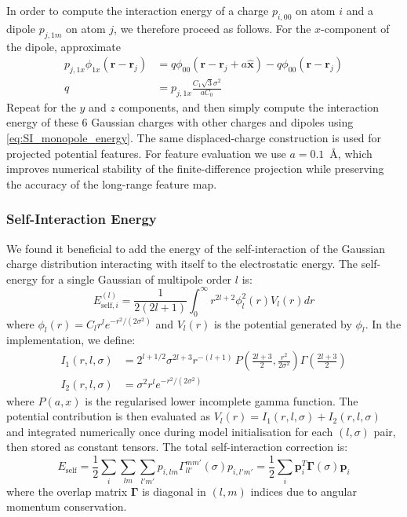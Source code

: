 \documentclass[aps,%
superscriptaddress,
 amsmath,amssymb,
floatfix,
twocolumn
]{revtex4-2}
\begin{document}
In order to compute the interaction energy of a charge $p_{i,00}$ on atom $i$ and a dipole $p_{j,1m}$ on atom $j$, we therefore proceed as follows. For the $x$-component of the dipole, approximate
\begin{align}
    p_{j,1x} \phi_{1x}(\mathbf{r}-\mathbf{r}_j) &= q \phi_{0 0}(\mathbf{r}-\mathbf{r}_j+a\hat{\mathbf{x}}) - q \phi_{0 0}(\mathbf{r}-\mathbf{r}_j) \\
    q &= p_{j,1x} \frac{C_1\sqrt{3}\sigma^2}{a C_0}
\end{align}
Repeat for the $y$ and $z$ components, and then simply compute the interaction energy of these $6$ Gaussian charges with other charges and dipoles using \eqref{eq:SI_monopole_energy}.
The same displaced-charge construction is used for projected potential features. For feature evaluation we use $a=0.1$~\AA{}, which improves numerical stability of the finite-difference projection while preserving the accuracy of the long-range feature map.

\subsubsection{Self-Interaction Energy}

We found it beneficial to add the energy of the self-interaction of the Gaussian charge distribution interacting with itself to the electrostatic energy. The self-energy for a single Gaussian of multipole order $l$ is:
\begin{equation}
E_{\text{self},i}^{(l)} = \frac{1}{2(2l+1)} \int_0^\infty r^{2l+2} \phi_l^2(r) V_l(r) dr
\end{equation}
where $\phi_l(r) = C_l r^l e^{-r^2/(2\sigma^2)}$ and $V_l(r)$ is the potential generated by $\phi_l$. In the implementation, we define:
\begin{align}
I_1(r,l,\sigma) &= 2^{l+1/2}\sigma^{2l+3}r^{-(l+1)}\,P\!\left(\frac{2l+3}{2}, \frac{r^2}{2\sigma^2}\right)\Gamma\!\left(\frac{2l+3}{2}\right) \\
I_2(r,l,\sigma) &= \sigma^2 r^l e^{-r^2/(2\sigma^2)}
\end{align}
where $P(a,x)$ is the regularised lower incomplete gamma function. The potential contribution is then evaluated as $V_l(r)=I_1(r,l,\sigma)+I_2(r,l,\sigma)$ and integrated numerically once during model initialisation for each $(l, \sigma)$ pair, then stored as constant tensors. The total self-interaction correction is:
\begin{equation}
E_{\text{self}} = \frac{1}{2} \sum_i \sum_{lm} \sum_{l'm'} p_{i,lm} \Gamma_{ll'}^{mm'}(\sigma) p_{i,l'm'} = \frac{1}{2} \sum_i \mathbf{p}_i^T \mathbf{\Gamma}(\sigma) \mathbf{p}_i
\end{equation}
where the overlap matrix $\mathbf{\Gamma}$ is diagonal in $(l,m)$ indices due to angular momentum conservation.
\end{document}
